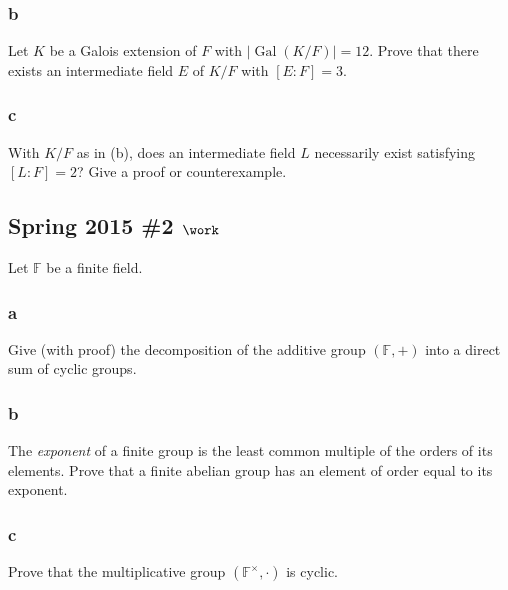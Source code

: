 \hypertarget{b-61}{%
\subsubsection{b}\label{b-61}}

Let \(K\) be a Galois extension of \(F\) with
\({\left\lvert {\operatorname{Gal}(K/F)} \right\rvert} = 12\). Prove
that there exists an intermediate field \(E\) of \(K/F\) with
\([E: F] = 3\).

\hypertarget{c-42}{%
\subsubsection{c}\label{c-42}}

With \(K/F\) as in (b), does an intermediate field \(L\) necessarily
exist satisfying \([L: F] = 2\)? Give a proof or counterexample.

\hypertarget{spring-2015-2-work}{%
\subsection{\texorpdfstring{Spring 2015 \#2
\(\work\)}{Spring 2015 \#2 \textbackslash work}}\label{spring-2015-2-work}}

Let \({\mathbb{F}}\) be a finite field.

\hypertarget{a-72}{%
\subsubsection{a}\label{a-72}}

Give (with proof) the decomposition of the additive group
\(({\mathbb{F}}, +)\) into a direct sum of cyclic groups.

\hypertarget{b-62}{%
\subsubsection{b}\label{b-62}}

The \emph{exponent} of a finite group is the least common multiple of
the orders of its elements. Prove that a finite abelian group has an
element of order equal to its exponent.

\hypertarget{c-43}{%
\subsubsection{c}\label{c-43}}

Prove that the multiplicative group \(({\mathbb{F}}^{\times}, \cdot)\)
is cyclic.

